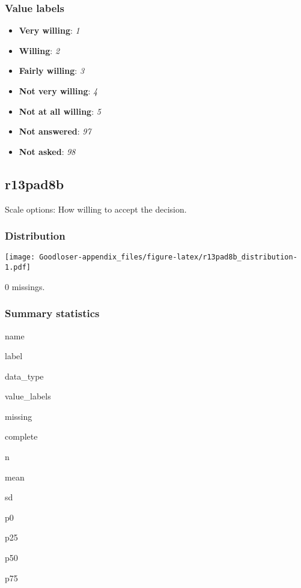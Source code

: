 \documentclass[]{book}
\providecommand{\tightlist}{%
  \setlength{\itemsep}{0pt}\setlength{\parskip}{0pt}}
\begin{document}
\subsubsection{Value labels}\label{r13pad8a_labels}

\begin{itemize}
\tightlist
\item
  \textbf{Very willing}: \emph{1}
\item
  \textbf{Willing}: \emph{2}
\item
  \textbf{Fairly willing}: \emph{3}
\item
  \textbf{Not very willing}: \emph{4}
\item
  \textbf{Not at all willing}: \emph{5}
\item
  \textbf{Not answered}: \emph{97}
\item
  \textbf{Not asked}: \emph{98}
\end{itemize}

\subsection{r13pad8b}\label{r13pad8b}

Scale options: How willing to accept the decision.

\subsubsection{Distribution}\label{r13pad8b_distribution}

\texttt{[image: Goodloser-appendix\_files/figure-latex/r13pad8b\_distribution-1.pdf]}

0 missings.

\subsubsection{Summary statistics}\label{r13pad8b_summary}

name

label

data\_type

value\_labels

missing

complete

n

mean

sd

p0

p25

p50

p75
\end{document}
